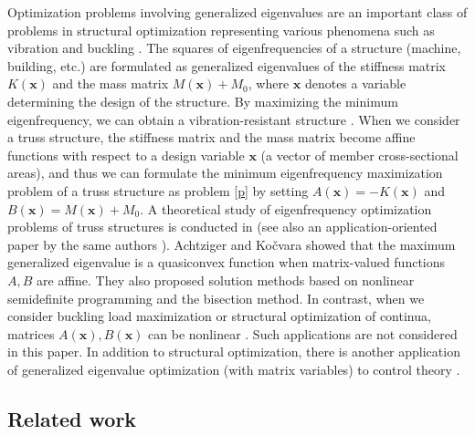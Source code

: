 \documentclass[sn-mathphys,Numbered]{sn-jnl}%
\theoremstyle{thmstyleone}%
\theoremstyle{thmstyletwo}%
\theoremstyle{thmstylethree}%
\begin{document}
Optimization problems involving generalized eigenvalues are an important class of problems in structural optimization representing various phenomena such as vibration and buckling \cite{achtziger07smo,achtziger07siam,deaton14,ferrari19,ohsaki99,seyranian94,torii17}. The squares of eigenfrequencies of a structure (machine, building, etc.) are formulated as generalized eigenvalues of the stiffness matrix $K(\bm{x})$ and the mass matrix $M(\bm{x})+M_0$, where $\bm{x}$ denotes a variable determining the design of the structure. By maximizing the minimum eigenfrequency, we can obtain a vibration-resistant structure \cite{achtziger07smo,achtziger07siam,ohsaki99}. When we consider a truss structure, the stiffness matrix and the mass matrix become affine functions with respect to a design variable $\bm{x}$ (a vector of member cross-sectional areas), and thus we can formulate the minimum eigenfrequency maximization problem of a truss structure as problem \eqref{p} by setting $A(\bm{x})=-K(\bm{x})$ and $B(\bm{x})=M(\bm{x})+M_0$. A theoretical study of eigenfrequency optimization problems of truss structures is conducted in \cite{achtziger07siam} (see also an application-oriented paper by the same authors \cite{achtziger07smo}). Achtziger and Ko\v{c}vara \cite{achtziger07siam} showed that the maximum generalized eigenvalue is a quasiconvex function when matrix-valued functions $A,B$ are affine. They also proposed solution methods based on nonlinear semidefinite programming and the bisection method. In contrast, when we consider buckling load maximization or structural optimization of continua, matrices $A(\bm{x}),B(\bm{x})$ can be nonlinear \cite{ferrari19,kocvara02,torii17}. Such applications are not considered in this paper. In addition to structural optimization, there is another application of generalized eigenvalue optimization (with matrix variables) to control theory \cite{boyd93}.

\subsection{Related work}
\end{document}
